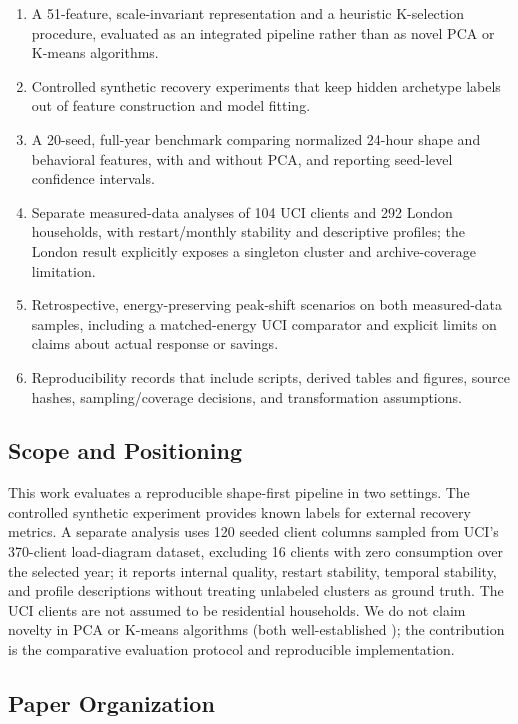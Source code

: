 \documentclass[11pt,a4paper]{article}
\begin{document}
\begin{enumerate}
    \item A 51-feature, scale-invariant representation and a heuristic K-selection procedure, evaluated as an integrated pipeline rather than as novel PCA or K-means algorithms.
    \item Controlled synthetic recovery experiments that keep hidden archetype labels out of feature construction and model fitting.
    \item A 20-seed, full-year benchmark comparing normalized 24-hour shape and behavioral features, with and without PCA, and reporting seed-level confidence intervals.
    \item Separate measured-data analyses of 104 UCI clients and 292 London households, with restart/monthly stability and descriptive profiles; the London result explicitly exposes a singleton cluster and archive-coverage limitation.
    \item Retrospective, energy-preserving peak-shift scenarios on both measured-data samples, including a matched-energy UCI comparator and explicit limits on claims about actual response or savings.
    \item Reproducibility records that include scripts, derived tables and figures, source hashes, sampling/coverage decisions, and transformation assumptions.
\end{enumerate}

\subsection{Scope and Positioning}

This work evaluates a reproducible shape-first pipeline in two settings. The controlled synthetic experiment provides known labels for external recovery metrics. A separate analysis uses 120 seeded client columns sampled from UCI's 370-client load-diagram dataset, excluding 16 clients with zero consumption over the selected year; it reports internal quality, restart stability, temporal stability, and profile descriptions without treating unlabeled clusters as ground truth. The UCI clients are not assumed to be residential households. We do not claim novelty in PCA or K-means algorithms (both well-established \cite{jolliffe2002pca,lloyd1982least,arthur2007kmeans}); the contribution is the comparative evaluation protocol and reproducible implementation.

\subsection{Paper Organization}
\end{document}
